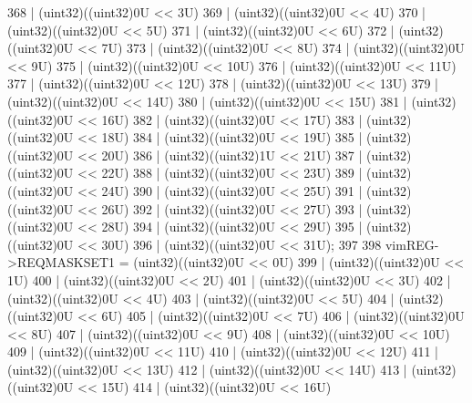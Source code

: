 \begin{DoxyCode}
368                         | (uint32)((uint32)0U << 3U)
369                         | (uint32)((uint32)0U << 4U)
370                         | (uint32)((uint32)0U << 5U)
371                         | (uint32)((uint32)0U << 6U)
372                         | (uint32)((uint32)0U << 7U)
373                         | (uint32)((uint32)0U << 8U)
374                         | (uint32)((uint32)0U << 9U)
375                         | (uint32)((uint32)0U << 10U)
376                         | (uint32)((uint32)0U << 11U)
377                         | (uint32)((uint32)0U << 12U)
378                         | (uint32)((uint32)0U << 13U)
379                         | (uint32)((uint32)0U << 14U)
380                         | (uint32)((uint32)0U << 15U)
381                         | (uint32)((uint32)0U << 16U)
382                         | (uint32)((uint32)0U << 17U)
383                         | (uint32)((uint32)0U << 18U)
384                         | (uint32)((uint32)0U << 19U)
385                         | (uint32)((uint32)0U << 20U)
386                         | (uint32)((uint32)1U << 21U)
387                         | (uint32)((uint32)0U << 22U)
388                         | (uint32)((uint32)0U << 23U)
389                         | (uint32)((uint32)0U << 24U)
390                         | (uint32)((uint32)0U << 25U)
391                         | (uint32)((uint32)0U << 26U)
392                         | (uint32)((uint32)0U << 27U)
393                         | (uint32)((uint32)0U << 28U)
394                         | (uint32)((uint32)0U << 29U)
395                         | (uint32)((uint32)0U << 30U)
396                         | (uint32)((uint32)0U << 31U);
397 
398     vimREG->REQMASKSET1 = (uint32)((uint32)0U << 0U)
399                         | (uint32)((uint32)0U << 1U)
400                         | (uint32)((uint32)0U << 2U)
401                         | (uint32)((uint32)0U << 3U)
402                         | (uint32)((uint32)0U << 4U)
403                         | (uint32)((uint32)0U << 5U)
404                         | (uint32)((uint32)0U << 6U)
405                         | (uint32)((uint32)0U << 7U)
406                         | (uint32)((uint32)0U << 8U)
407                         | (uint32)((uint32)0U << 9U)
408                         | (uint32)((uint32)0U << 10U)
409                         | (uint32)((uint32)0U << 11U)
410                         | (uint32)((uint32)0U << 12U)
411                         | (uint32)((uint32)0U << 13U)
412                         | (uint32)((uint32)0U << 14U)
413                         | (uint32)((uint32)0U << 15U)
414                         | (uint32)((uint32)0U << 16U)

\end{DoxyCode}
